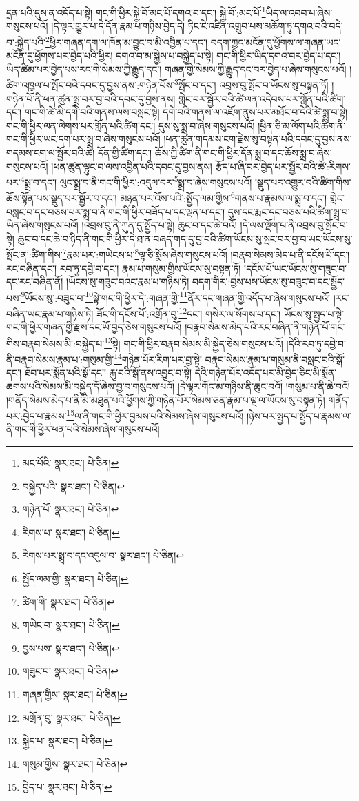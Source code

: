 དྲན་པའི་དུས་ན་འདོད་པ་སྟེ། གང་གི་ཕྱིར་སྐྱེ་བོ་མང་པོ་དགའ་བ་དང་། སྐྱེ་བོ་:མང་པོ་\footnote{མང་པོའི་  སྣར་ཐང་།  པེ་ཅིན། }ཡིད་ལ་འབབ་པ་ཞེས་གསུངས་པའོ། །དེ་ལྟར་གྱུར་པ་དེ་དོན་རྣམ་པ་གཉིས་བྱེད་དེ། ཏིང་ངེ་འཛིན་འགྲུབ་པས་མཆོག་ཏུ་དགའ་བའི་བདེ་བ་:སྐྱེད་པའི་\footnote{བསྐྱེད་པའི་  སྣར་ཐང་།  པེ་ཅིན། }ཕྱིར་གཞན་དག་ལ་ཁོན་མ་བྱུང་བ་མི་འབྱིན་པ་དང་། བདག་ཀྱང་མངོན་དུ་ཕྱོགས་ལ་གཞན་ཡང་མངོན་དུ་ཕྱོགས་པར་བྱེད་པའི་ཕྱིར། དགའ་བ་མ་སྐྱེས་པ་བསྐྱེད་པ་སྟེ། གང་གི་ཕྱིར་ཡིད་དགའ་བར་བྱེད་པ་དང་། ཡིད་ཚིམ་པར་བྱེད་པས་རང་གི་སེམས་ཀྱི་རྒྱུད་དང་། གཞན་གྱི་སེམས་ཀྱི་རྒྱུད་དང་བར་བྱེད་པ་ཞེས་གསུངས་པའོ། །ཚིག་འཁྱལ་པ་སྤོང་བའི་དབང་དུ་བྱས་ནས་:གཉེན་པོས་\footnote{གཉེན་པོ་  སྣར་ཐང་།  པེ་ཅིན། }སྤོང་བ་དང་། འབྲས་བུ་སྤོང་བ་ཡོངས་སུ་བསྟན་ཏོ། །གཉེན་པོ་ནི་ཕན་ཚུན་སྨྲ་བར་བྱ་བའི་དབང་དུ་བྱས་ནས། གླེང་བར་སྦྱོར་བའི་ཚེ་ལན་འདེབས་པར་གློན་པའི་ཚིག་དང་། གང་གི་ཚེ་མི་དགེ་བའི་གནས་ལས་བསླང་སྟེ། དགེ་བའི་གནས་ལ་འཇོག་ནུས་པར་མཐོང་བ་དེའི་ཚེ་སྨྲ་བ་སྟེ། གང་གི་ཕྱིར་ལན་ལེགས་པར་གློན་པའི་ཚིག་དང་། དུས་སུ་སྨྲ་བ་ཞེས་གསུངས་པའོ། །ཕྱིན་ཅི་མ་ལོག་པའི་ཚིག་ནི་གང་གི་ཕྱིར་ཡང་དག་པར་སྨྲ་བ་ཞེས་གསུངས་པའོ། །ཕན་ཚུན་གདམས་ངག་རྗེས་སུ་བསྟན་པའི་དབང་དུ་བྱས་ནས་གདམས་ངག་ལ་སྦྱོར་བའི་ཚེ། དོན་གྱི་ཚིག་དང་། ཆོས་ཀྱི་ཚིག་ནི་གང་གི་ཕྱིར་དོན་སྨྲ་བ་དང་ཆོས་སྨྲ་བ་ཞེས་གསུངས་པའོ། །ཕན་ཚུན་ལྟུང་བ་ལས་འབྱིན་པའི་དབང་དུ་བྱས་ནས། རྩོད་པ་ཞི་བར་བྱེད་པར་སྦྱོར་བའི་ཚེ་:རིགས་པར་\footnote{རིགས་པ་  སྣར་ཐང་།  པེ་ཅིན། }སྨྲ་བ་དང་། ལུང་སྨྲ་བ་ནི་གང་གི་ཕྱིར་:འདུལ་བར་\footnote{རིགས་པར་སྨྲ་བ་དང་འདུལ་བ་  སྣར་ཐང་།  པེ་ཅིན། }སྨྲ་བ་ཞེས་གསུངས་པའོ། །སྡུད་པར་འགྱུར་བའི་ཚིག་གིས་ཆོས་སྟོན་པས་སྡུད་པར་སྦྱོར་བ་དང་། མཉན་པར་འོས་པའི་:སྤྱོད་ལམ་གྱིས་\footnote{སྤྱོད་ལམ་གྱི་  སྣར་ཐང་།  པེ་ཅིན། }གནས་པ་རྣམས་ལ་སྨྲ་བ་དང་། གླེང་བསླང་བ་དང་བཅས་པར་སྨྲ་བ་ནི་གང་གི་ཕྱིར་བཟོད་པ་དང་ལྡན་པ་དང་། དུས་དང་རྨང་དང་བཅས་པའི་ཚིག་སྨྲ་བ་ཡིན་ཞེས་གསུངས་པའོ། །འབྲས་བུ་ནི་ཀུན་དུ་སྤྱོད་པ་སྟེ། ཆུང་བ་དང་ཆེ་བའོ། །དེ་ལས་ལྡོག་པ་ནི་འབྲས་བུ་སྤོང་བ་སྟེ། ཆུང་བ་དང་ཆེ་བ་ཉིད་ནི་གང་གི་ཕྱིར་དེ་ཐ་ན་བཞད་གད་དུ་བྱ་བའི་ཚིག་ཡོངས་སུ་སྤང་བར་བྱ་བ་ཡང་ཡོངས་སུ་སྤོང་ན་:ཚིག་གིས་\footnote{ཚིག་གི་  སྣར་ཐང་།  པེ་ཅིན། }རྣམ་པར་:གཡེངས་པ་\footnote{གཡེང་བ་  སྣར་ཐང་།  པེ་ཅིན། }ལྟ་ཅི་སྨོས་ཞེས་གསུངས་པའོ། །བརྣབ་སེམས་མེད་པ་ནི་དངོས་པོ་དང་། རང་བཞིན་དང་། རབ་ཏུ་དབྱེ་བ་དང་། རྣམ་པ་གསུམ་གྱིས་ཡོངས་སུ་བསྟན་ཏོ། །དངོས་པོ་ཡང་ཡོངས་སུ་གཟུང་བ་དང་རང་བཞིན་ནོ། །ཡོངས་སུ་གཟུང་བའང་རྣམ་པ་གཉིས་ཏེ། བདག་གིར་:བྱས་པས་ཡོངས་སུ་བཟུང་བ་དང་སྤྱོད་པས་\footnote{བྱས་པས་  སྣར་ཐང་།  པེ་ཅིན། }ཡོངས་སུ་:བཟུང་བ་\footnote{གཟུང་བ་  སྣར་ཐང་།  པེ་ཅིན། }སྟེ་གང་གི་ཕྱིར་དེ་:གཞན་གྱི་\footnote{གཞན་གྱིས་  སྣར་ཐང་།  པེ་ཅིན། }ནོར་དང་གཞན་གྱི་འདོད་པ་ཞེས་གསུངས་པའོ། །རང་བཞིན་ཡང་རྣམ་པ་གཉིས་ཏེ། ཟོང་གི་དངོས་པོ་:འགྲོན་བུ་\footnote{མགྲོན་བུ་  སྣར་ཐང་།  པེ་ཅིན། }དང་། གསེར་ལ་སོགས་པ་དང་། ཡོངས་སུ་སྤྱད་པ་སྟེ་གང་གི་ཕྱིར་གཞན་གྱི་རྫས་དང་ཡོ་བྱད་ཅེས་གསུངས་པའོ། །བརྣབ་སེམས་མེད་པའི་རང་བཞིན་ནི་གཉེན་པོ་གང་གིས་བརྣབ་སེམས་མི་:བསྐྱེད་པ་\footnote{སྐྱེད་པ་  སྣར་ཐང་།  པེ་ཅིན། }སྟེ། གང་གི་ཕྱིར་བརྣབ་སེམས་མི་སྐྱེད་ཅེས་གསུངས་པའོ། །དེའི་རབ་ཏུ་དབྱེ་བ་ནི་བརྣབ་སེམས་རྣམ་པ་:གསུམ་གྱི་\footnote{གསུམ་གྱིས་  སྣར་ཐང་།  པེ་ཅིན། }གཉེན་པོར་རིག་པར་བྱ་སྟེ། བརྣབ་སེམས་རྣམ་པ་གསུམ་ནི་བསླང་བའི་སྒོ་དང་། ཐོབ་པར་སྨོན་པའི་སྒོ་དང་། རྐུ་བའི་སྒོ་ནས་འབྱུང་བ་སྟེ། དེའི་གཉེན་པོར་འདོད་པར་མི་བྱེད་ཅིང་མི་སྨོན་ཆགས་པའི་སེམས་མི་བསྐྱེད་དོ་ཞེས་བྱ་བ་གསུངས་པའོ། །དེ་ལྟར་གོང་མ་གཉིས་ནི་ཆུང་བའོ། །གསུམ་པ་ནི་ཆེ་བའོ། །གནོད་སེམས་མེད་པ་ནི་མི་མཐུན་པའི་ཕྱོགས་ཀྱི་གཉེན་པོར་སེམས་ཅན་རྣམ་པ་ལྔ་ལ་ཡོངས་སུ་བསྟན་ཏེ། གནོད་པར་:བྱེད་པ་རྣམས་\footnote{བྱེད་པ་  སྣར་ཐང་།  པེ་ཅིན། }ལ་ནི་གང་གི་ཕྱིར་བྱམས་པའི་སེམས་ཞེས་གསུངས་པའོ། །ཉེས་པར་སྤྱད་པ་སྤྱོད་པ་རྣམས་ལ་ནི་གང་གི་ཕྱིར་ཕན་པའི་སེམས་ཞེས་གསུངས་པའོ། 